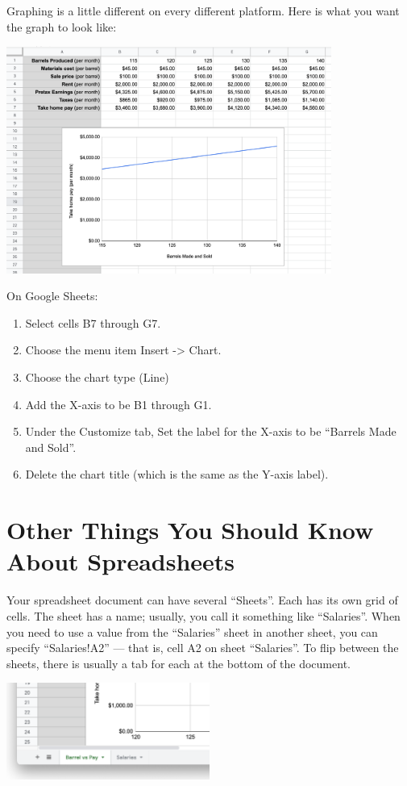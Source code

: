 Graphing is a little different on every different platform.  Here is what you want the graph to look like:

\includegraphics[width=0.8\textwidth]{BarrelGraph.png}

On Google Sheets:

\begin{enumerate}
\item Select cells B7 through G7. 
\item Choose the menu item Insert -> Chart.
\item Choose the chart type (Line)
\item Add the X-axis to be B1 through G1.
\item Under the Customize tab, Set the label for the X-axis to be ``Barrels Made and Sold''.
\item Delete the chart title (which is the same as the Y-axis label).
\end{enumerate}

\section{Other Things You Should Know About Spreadsheets}

Your spreadsheet document can have several ``Sheets''.  Each has its
own grid of cells.  The sheet has a name; usually, you call it
something like ``Salaries''.  When you need to use a value from the
``Salaries'' sheet in another sheet, you can specify ``Salaries!A2''
--- that is, cell A2 on sheet ``Salaries''.  To flip between the sheets,
there is usually a tab for each at the bottom of the document.

\includegraphics[width=0.5\textwidth]{Sheets.png}

